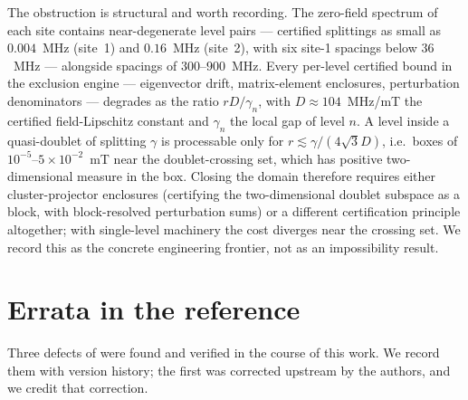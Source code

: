 \documentclass[11pt]{amsart}
\theoremstyle{plain}
\theoremstyle{definition}
\theoremstyle{remark}
\begin{document}
The obstruction is structural and worth recording.  The zero-field spectrum of
each site contains near-degenerate level pairs --- certified splittings as
small as $0.004$~MHz (site~1) and $0.16$~MHz (site~2), with six site-1
spacings below $36$~MHz --- alongside spacings of $300$--$900$~MHz.  Every per-level certified bound in the exclusion engine ---
eigenvector drift, matrix-element enclosures, perturbation denominators ---
degrades as the ratio $rD/\gamma_n$, with $D\approx104$~MHz/mT the certified
field-Lipschitz constant and $\gamma_n$ the local gap of level $n$.  A level
inside a quasi-doublet of splitting $\gamma$ is processable only for
$r\lesssim\gamma/(4\sqrt3D)$, i.e.\ boxes of $10^{-5}$--$5\times10^{-2}$~mT
near the doublet-crossing set, which has positive two-dimensional measure in
the box.  Closing the domain therefore requires either cluster-projector
enclosures (certifying the two-dimensional doublet subspace as a block, with
block-resolved perturbation sums) or a different certification principle
altogether; with single-level machinery the cost diverges near the crossing
set.  We record this as the concrete engineering frontier, not as an
impossibility result.

\section{Errata in the reference}\label{sec:errata}

Three defects of \cite{Matsuura} were found and verified in the course of this
work.  We record them with version history; the first was corrected upstream
by the authors, and we credit that correction.
\end{document}
